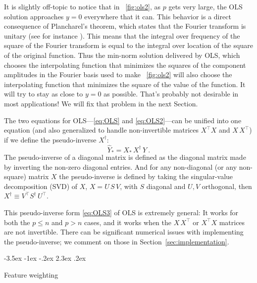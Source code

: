 \documentclass[12pt,letterpaper]{article}
\makeatletter
\renewcommand\section{\@startsection {section}{1}{\z@}%
  {-3.5ex \@plus -1ex \@minus -.2ex}%
  {2.3ex \@plus.2ex}%
  {\raggedright\normalfont\Large\bfseries}}
\newcommand{\sectionname}{Section}
\makeatother
\begin{document}
It is slightly off-topic to notice that in \figurename~\ref{fig:ols2}, as $p$ gets very large, the OLS solution approaches $y=0$ everywhere that it can.
This behavior is a direct consequence of Plancharel's theorem, which states that the Fourier transform is unitary (see for instance \citealt{folland2016course}).
This means that the integral over frequency of the square of the Fourier transform is equal to the integral over location of the square of the original function.
Thus the min-norm solution delivered by OLS, which chooses the interpolating function that minimizes the squares of the component amplitudes in the Fourier basis used to make \figurename~\ref{fig:ols2} will also choose the interpolating function that minimizes the square of the value of the function.
It will try to stay as close to $y=0$ as possible.
That's probably not desirable in most applications! We will fix that problem in the next \sectionname.

The two equations for OLS---\eqref{eq:OLS} and \eqref{eq:OLS2}---can be unified into one equation (and also generalized to handle non-invertible matrices $X^\top X$ and $X\,X^\top$) if we define the pseudo-inverse $X^\dagger$:
\begin{equation}\label{eq:OLS3}
    \hat{Y}_\ast = X_\ast\,X^\dagger\,Y
    ~.
\end{equation}
The pseudo-inverse of a diagonal matrix is defined as the diagonal matrix made by inverting the non-zero diagonal entries. And for any non-diagonal (or any non-square) matrix $X$ the pseudo-inverse is defined by taking the singular-value decomposition (SVD) of $X$, $X=U\,S\,V$, with $S$ diagonal and $U,V$ orthogonal, then $X^\dagger \equiv V^\top S^\dagger\,U^\top$.

This pseudo-inverse form \eqref{eq:OLS3} of OLS is extremely general: It works for both the $p\le n$ and $p>n$ cases, and it works when the $X\,X^\top$ or $X^\top X$ matrices are not invertible.
There can be significant numerical issues with implementing the pseudo-inverse; we comment on those in \sectionname~\ref{sec:implementation}.

\section{Feature weighting}\label{sec:fwols}
\end{document}
